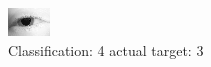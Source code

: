 \begin{figure}[h!]
\begin{center}
\includegraphics[width=0.60\columnwidth]{figures/ID173_class_4_target_3.png}
\end{center}
\caption{ Classification: 4 actual target: 3}
\label{fig:ID173_class_4_target_3}
\end{figure}
